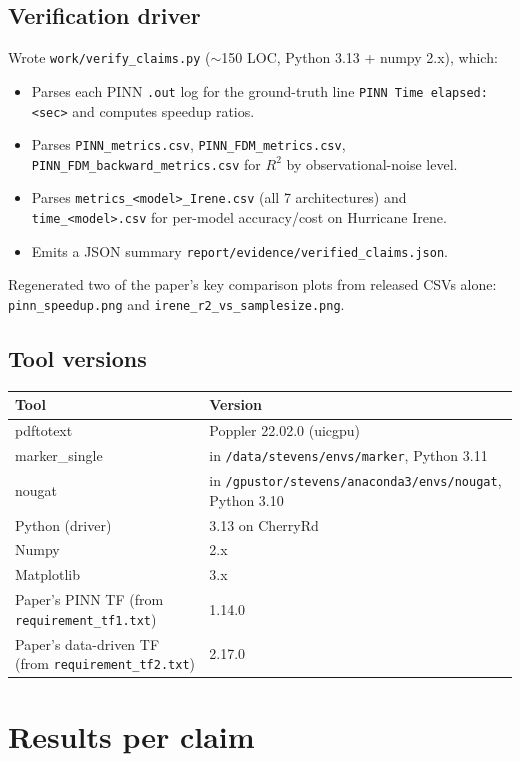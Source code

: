 \documentclass[11pt]{article}
\begin{document}
\subsection{Verification driver}
Wrote \texttt{work/verify\_claims.py} ($\sim$150 LOC, Python 3.13 + numpy 2.x), which:
\begin{itemize}
  \item Parses each PINN \texttt{.out} log for the ground-truth line
        \texttt{PINN Time elapsed: <sec>} and computes speedup ratios.
  \item Parses \texttt{PINN\_metrics.csv}, \texttt{PINN\_FDM\_metrics.csv},
        \texttt{PINN\_FDM\_backward\_metrics.csv} for $R^2$ by observational-noise level.
  \item Parses \texttt{metrics\_<model>\_Irene.csv} (all 7 architectures) and
        \texttt{time\_<model>.csv} for per-model accuracy/cost on Hurricane Irene.
  \item Emits a JSON summary \texttt{report/evidence/verified\_claims.json}.
\end{itemize}
Regenerated two of the paper's key comparison plots from released CSVs alone:
\texttt{pinn\_speedup.png} and \texttt{irene\_r2\_vs\_samplesize.png}.

\subsection{Tool versions}
\begin{tabular}{ll}
\toprule
Tool & Version \\
\midrule
pdftotext & Poppler 22.02.0 (uicgpu) \\
marker\_single & in \texttt{/data/stevens/envs/marker}, Python 3.11 \\
nougat & in \texttt{/gpustor/stevens/anaconda3/envs/nougat}, Python 3.10 \\
Python (driver) & 3.13 on CherryRd \\
Numpy & 2.x \\
Matplotlib & 3.x \\
Paper's PINN TF (from \texttt{requirement\_tf1.txt}) & 1.14.0 \\
Paper's data-driven TF (from \texttt{requirement\_tf2.txt}) & 2.17.0 \\
\bottomrule
\end{tabular}

\section{Results per claim}
\end{document}
